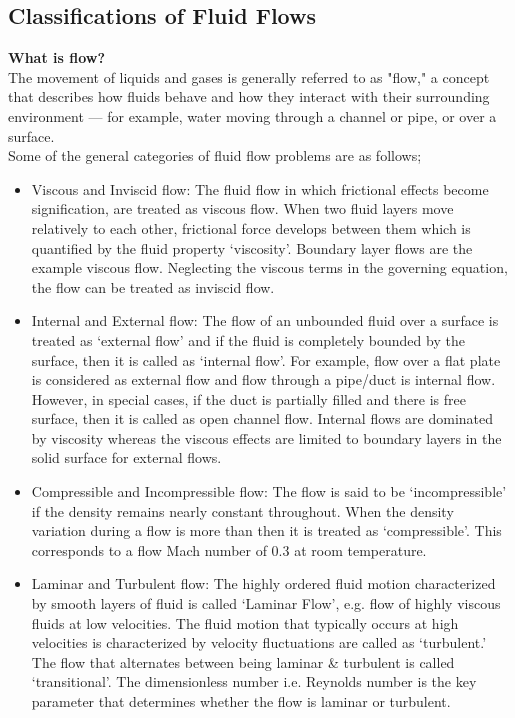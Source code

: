 \documentclass[a4paper,12pt]{report}
\begin{document}
{\subsection{Classifications of Fluid Flows}
\textbf{What is flow?}\\
The movement of liquids and gases is generally referred to as "flow," a concept that describes how fluids behave and how they interact with their surrounding environment — for example, water moving through a channel or pipe, or over a surface.\\
Some of the general categories of fluid flow problems are as follows;
\begin{itemize}
\item Viscous and Inviscid flow: The fluid flow in which frictional effects become signification, are treated as viscous flow. When two fluid layers move relatively to each other, frictional force develops between them which is quantified by the fluid property ‘viscosity’. Boundary layer flows are the example viscous flow. Neglecting the viscous terms in the governing equation, the flow can be treated as inviscid flow. 
\item Internal and External flow: The flow of an unbounded fluid over a surface is treated as ‘external flow’ and if the fluid is completely bounded by the surface, then it is called as ‘internal flow’. For example, flow over a flat plate is considered as external flow and flow through a pipe/duct is internal flow. However, in special cases, if the duct is partially filled and there is free surface, then it is called as open channel flow. Internal flows are dominated by viscosity whereas the viscous effects are limited to boundary layers in the solid surface for external flows. 
\item Compressible and Incompressible flow: The flow is said to be ‘incompressible’ if  the density remains nearly constant throughout. When the density variation during a  flow is more than then it is treated as ‘compressible’. This corresponds to a flow  Mach number of 0.3 at room temperature.  
\item Laminar and Turbulent flow: The highly ordered fluid motion characterized by  smooth layers of fluid is called ‘Laminar Flow’, e.g. flow of highly viscous fluids at  low velocities. The fluid motion that typically occurs at high velocities is  characterized by velocity fluctuations are called as ‘turbulent.’ The flow that alternates between being laminar \& turbulent is called ‘transitional’. The dimensionless number i.e. Reynolds number is the key parameter that determines whether the flow is laminar or turbulent.  

\end{itemize}}
\end{document}
